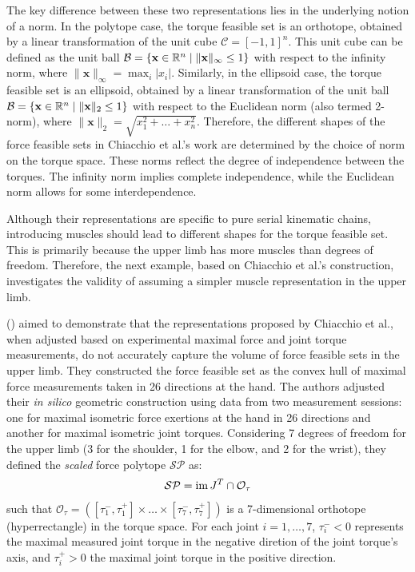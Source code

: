 The key difference between these two representations lies in the underlying notion of a norm. In the polytope case, the torque feasible set is an orthotope, obtained by a linear transformation of the unit cube $\mathcal{C} = [-1,1]^n$. This unit cube can be defined as the unit ball $\mathcal{B} = \{\mathbf{x}\in\mathbb{R}^n \mid \| \mathbf{x} \|_{\infty} \leq 1 \}$ with respect to the infinity norm, where $\|\mathbf{x}\|_{\infty} = \max_i \vert x_i \vert$. Similarly, in the ellipsoid case, the torque feasible set is an ellipsoid, obtained by a linear transformation of the unit ball $\mathcal{B} = \{\mathbf{x}\in\mathbb{R}^n \mid \| \mathbf{x} \|_{2} \leq 1 \}$ with respect to the Euclidean norm (also termed 2-norm), where $\|\mathbf{x}\|_2 = \sqrt{x_1^2 + \dots + x_n^2}$. Therefore, the different shapes of the force feasible sets in Chiacchio et al.'s work are determined by the choice of norm on the torque space. These norms reflect the degree of independence between the torques. The infinity norm implies complete independence, while the Euclidean norm allows for some interdependence.

Although their representations are specific to pure serial kinematic chains, introducing muscles should lead to different shapes for the torque feasible set. This is primarily because the upper limb has more muscles than degrees of freedom. Therefore, the next example, based on Chiacchio et al.'s construction, investigates the validity of assuming a simpler muscle representation in the upper limb.

(\cite{rezzougUpperLimbIsometricForce2021b}) aimed to demonstrate that the representations proposed by Chiacchio et al., when adjusted based on experimental maximal force and joint torque measurements, do not accurately capture the volume of force feasible sets in the upper limb. They constructed the force feasible set as the convex hull of maximal force measurements taken in 26 directions at the hand. The authors adjusted their \emph{in silico} geometric construction using data from two measurement sessions: one for maximal isometric force exertions at the hand in 26 directions and another for maximal isometric joint torques. Considering 7 degrees of freedom for the upper limb (3 for the shoulder, 1 for the elbow, and 2 for the wrist), they defined the \emph{scaled} force polytope $\mathcal{SP}$ as:
\begin{align*}
    \mathcal{SP} = \operatorname{im}{J^T} \cap \mathcal{O}_{\tau}
\end{align*}
such that $\mathcal{O}_{\tau} = \left([\tau_1^-, \tau_1^+]\times \dots \times [\tau_7^-, \tau_7^+]\right)$ is a 7-dimensional orthotope (hyperrectangle) in the torque space. For each joint $i = 1, \dots, 7$, $\tau_i^- < 0$ represents the maximal measured joint torque in the negative diretion of the joint torque's axis, and $\tau_i^+ > 0$ the maximal joint torque in the positive direction. 

